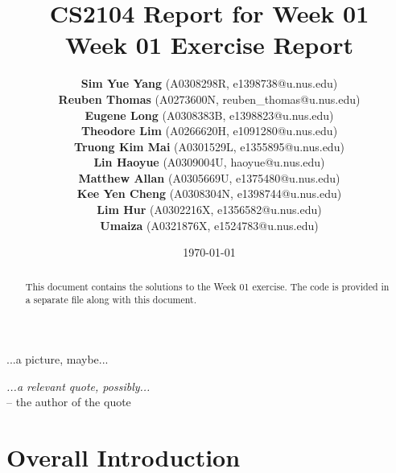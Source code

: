 \documentclass[12pt]{article}
\begin{document}
\title{
  CS2104 Report for Week 01
  \\
  Week 01 Exercise Report
}

\author{
    \textbf{Sim Yue Yang} (A0308298R, e1398738@u.nus.edu) \\
    \textbf{Reuben Thomas} (A0273600N, reuben\_thomas@u.nus.edu) \\
    \textbf{Eugene Long} (A0308383B, e1398823@u.nus.edu) \\
    \textbf{Theodore Lim} (A0266620H, e1091280@u.nus.edu) \\
    \textbf{Truong Kim Mai} (A0301529L, e1355895@u.nus.edu) \\
    \textbf{Lin Haoyue} (A0309004U, haoyue@u.nus.edu) \\
    \textbf{Matthew Allan} (A0305669U, e1375480@u.nus.edu) \\
    \textbf{Kee Yen Cheng} (A0308304N, e1398744@u.nus.edu) \\
    \textbf{Lim Hur} (A0302216X, e1356582@u.nus.edu) \\
    \textbf{Umaiza} (A0321876X, e1524783@u.nus.edu)
}

\date{\today}

\maketitle

\begin{abstract}
This document contains the solutions to the Week 01 exercise. The code is provided in a separate file along with this document.
\end{abstract}

\vfill

\begin{center}
...a picture, maybe...
\end{center}

\vfill

\begin{flushright}
\emph{...a relevant quote, possibly...} \\
-- the author of the quote
\end{flushright}

\newpage

\tableofcontents

\newpage


\section{Overall Introduction}
\label{sec:overall-introduction}
\end{document}
